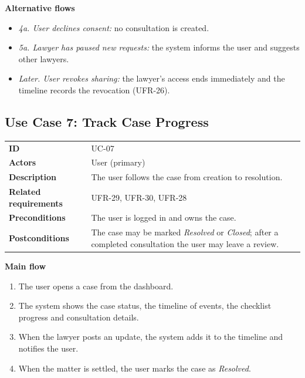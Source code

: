 \textbf{Alternative flows}

\begin{itemize}
  \item \emph{4a. User declines consent:} no consultation is created.
  \item \emph{5a. Lawyer has paused new requests:} the system informs the user and suggests other lawyers.
  \item \emph{Later. User revokes sharing:} the lawyer's access ends immediately and the timeline records the revocation (UFR-26).
\end{itemize}

\subsection{Use Case 7: Track Case Progress}

\begin{center}
\begin{tabular}{|L{3.96cm}|L{10.97cm}|}
\hline\headrow {} &  \\ \hline
\textbf{ID} & UC-07 \\ \hline
\textbf{Actors} & User (primary) \\ \hline
\textbf{Description} & The user follows the case from creation to resolution. \\ \hline
\textbf{Related requirements} & UFR-29, UFR-30, UFR-28 \\ \hline
\textbf{Preconditions} & The user is logged in and owns the case. \\ \hline
\textbf{Postconditions} & The case may be marked \emph{Resolved} or \emph{Closed}; after a completed consultation the user may leave a review. \\ \hline
\end{tabular}
\end{center}

\textbf{Main flow}

\begin{enumerate}
  \item The user opens a case from the dashboard.
  \item The system shows the case status, the timeline of events, the checklist progress and consultation details.
  \item When the lawyer posts an update, the system adds it to the timeline and notifies the user.
  \item When the matter is settled, the user marks the case as \emph{Resolved}.
\end{enumerate}

